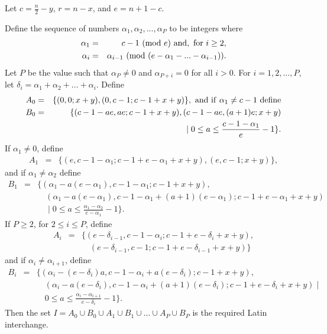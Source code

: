 \documentclass[12pt]{report}
\begin{document}
Let $c = \displaystyle{\frac{n}{2}} - y$, $r = n - x$, and $e = n + 1 - c$.

Define the sequence of numbers $\alpha_{1}, \alpha_{2}, ..., \alpha_{P}$ to be integers where
\begin{eqnarray*}
\alpha_{1} & = & c - 1 {\rm ~(mod~}e) {\rm ~and,~for~} i \geq 2, \\
\alpha_{i} & = & \alpha_{i-1} {\rm ~(mod~}(e-\alpha_{1}-...-\alpha_{i-1})).
\end{eqnarray*}
Let $P$ be the value such that $\alpha_{P} \neq 0$ and $\alpha_{P+i} = 0$ for all $i > 0$.
For $i = 1, 2, ..., P$, let $\delta_{i} = \alpha_{1} + \alpha_{2} + ... + \alpha_{i}$.
Define
\begin{eqnarray*}
A_{0} &=& \{ (0,0; x+y), (0,c-1; c-1+x+y) \}, {\rm ~and~if~} \alpha_{1} \neq c - 1 {\rm ~define}\\
B_{0} &=& \{ (c - 1 - ae, ae; c-1+x+y), (c - 1 - ae, (a + 1) e; x+y) \\ 
&& \quad{}\mid  0 \leq a \leq \displaystyle{\frac{c-1-\alpha_{1}}{e}} - 1 \}.
\end{eqnarray*}
If $\alpha_{1} \neq 0$, define
\begin{eqnarray*}
A_{1} &=& \{ (e, c - 1 - \alpha_{1}; c-1+e-\alpha_{1}+x+y), (e,c-1;x+y) \},
\end{eqnarray*}
and if $\alpha_{1} \neq \alpha_{2}$ define
\begin{eqnarray*}
B_{1} &=& \{ (\alpha_{1} - a(e-\alpha_{1}), c - 1 - \alpha_{1}; c-1+x+y ), \\
&& \quad{}(\alpha_{1} - a (e - \alpha_{1}), c - 1 - \alpha_{1} + (a+1)(e-\alpha_{1}); c-1+e-\alpha_{1}+x+y) \\
&& \quad{}\mid 0 \leq a \leq \displaystyle{\frac{\alpha_{1}-\alpha_{2}}{e-\alpha_{1}}} - 1 \}.
\end{eqnarray*}
If $P \geq 2$, for $2 \leq i \leq P$, define
\begin{eqnarray*}
A_{i} &=& \{ (e - \delta_{i-1}, c - 1 - \alpha_{i} ; c-1+e-\delta_{i}+x+y), \\
&& \quad{}(e - \delta_{i-1}, c-1; c-1+e-\delta_{i-1}+x+y) \} 
\end{eqnarray*}
and if $\alpha_{i} \neq \alpha_{i+1}$, define
\begin{eqnarray*}
B_{i} &=& \{ ( \alpha_{i} - (e-\delta_{i})a, c - 1 - \alpha_{i} + a (e-\delta_{i}); c-1+x+y ), \\
&& \quad{}(\alpha_{i} - a(e-\delta_{i}), c - 1 - \alpha_{i} + (a+1)(e-\delta_{i}); c-1+e-\delta_{i}+x+y) \mid  \\
&& \quad{}0 \leq a \leq \displaystyle{\frac{\alpha_{i}-\alpha_{i+1}}{e-\delta_{i}}} - 1 \}.
\end{eqnarray*}
Then the set $I = A_{0} \cup B_{0} \cup A_{1} \cup B_{1} \cup ... \cup A_{P} \cup B_{P}$ is the required Latin interchange.




%
%
\end{document}
